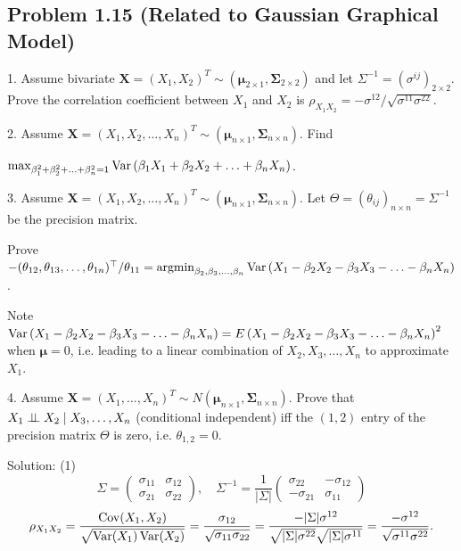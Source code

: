 \subsection*{Problem 1.15 (Related to Gaussian Graphical Model)}
1. Assume bivariate $\boldsymbol{X}=\left(X_{1},X_{2}\right)^{T}\sim\left(\boldsymbol{\mu}_{2\times 1},\boldsymbol{\Sigma}_{2\times 2}\right)$ and let $\Sigma^{-1}=\left(\sigma^{ij}\right)_{2\times 2}$. Prove the correlation coefficient between $X_{1}$ and $X_{2}$ is $\rho_{X_{1}X_{2}}=-\sigma^{12}/\sqrt{\sigma^{11}\sigma^{22}}$.

2. Assume $\boldsymbol{X}=(X_{1},X_{2},\ldots,X_{n})^{T}\sim(\boldsymbol{\mu}_{n\times 1},\boldsymbol{\Sigma}_{n\times n})$. Find

$\max_{\beta_{1}^{2}+\beta_{2}^{2}+\ldots+\beta_{n}^{2}=1}\operatorname{Var}\left(\beta_{1}X_{1}+\beta_{2}X_{2}+\ldots+\beta_{n}X_{n}\right)$.

3. Assume $\boldsymbol{X}=(X_{1},X_{2},\ldots,X_{n})^{T}\sim(\boldsymbol{\mu}_{n\times 1},\boldsymbol{\Sigma}_{n\times n})$. Let $\Theta=(\theta_{ij})_{n\times n}=\Sigma^{-1}$ be the precision matrix. 

Prove $-(\theta_{12},\theta_{13},\ldots,\theta_{1n})^{\top}/\theta_{11}=\operatorname{argmin}_{\beta_{2},\beta_{3},\ldots,\beta_{n}}\operatorname{Var}\left(X_{1}-\beta_{2}X_{2}-\beta_{3}X_{3}-\ldots-\beta_{n}X_{n}\right)$.

Note $\operatorname{Var}\left(X_{1}-\beta_{2}X_{2}-\beta_{3}X_{3}-\ldots-\beta_{n}X_{n}\right)=E\left(X_{1}-\beta_{2}X_{2}-\beta_{3}X_{3}-\ldots-\beta_{n}X_{n}\right)^{2}$ when $\boldsymbol{\mu}=0$, i.e. leading to a linear combination of $X_{2},X_{3},\ldots,X_{n}$ to approximate $X_{1}$.

4. Assume $\boldsymbol{X}=(X_{1},\ldots,X_{n})^{T}\sim N\left(\boldsymbol{\mu}_{n\times 1},\boldsymbol{\Sigma}_{n\times n}\right)$. Prove that $X_{1}\perp\!\!\!\perp X_{2}\mid X_{3},\ldots,X_{n}$ (conditional independent) iff the $(1,2)$ entry of the precision matrix $\Theta$ is zero, i.e. $\theta_{1,2}=0$.

{Solution:}
(1)
\[
\Sigma=\begin{pmatrix}\sigma_{11}&\sigma_{12}\\ \sigma_{21}&\sigma_{22}\end{pmatrix},\quad
\Sigma^{-1}=\frac{1}{|\Sigma|}\begin{pmatrix}\sigma_{22}&-\sigma_{12}\\ -\sigma_{21}&\sigma_{11}\end{pmatrix}
\]
\[
\rho_{X_{1}X_{2}}=\frac{\operatorname{Cov}(X_{1},X_{2})}{\sqrt{\operatorname{Var}(X_{1})\operatorname{Var}(X_{2})}}=\frac{\sigma_{12}}{\sqrt{\sigma_{11}\sigma_{22}}}=\frac{-|\Sigma|\sigma^{12}}{\sqrt{|\Sigma|\sigma^{22}}\sqrt{|\Sigma|\sigma^{11}}}=\frac{-\sigma^{12}}{\sqrt{\sigma^{11}\sigma^{22}}}.
\]


